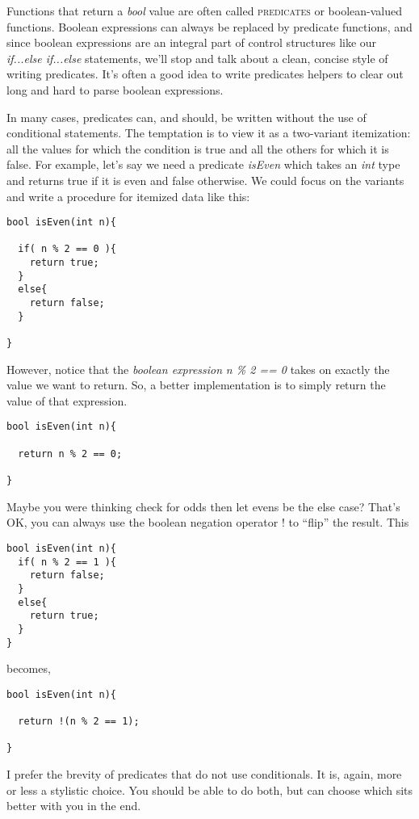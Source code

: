 \documentclass[]{tufte-handout}
\begin{document}
Functions that return a \textit{bool} value are often called \textsc{predicates} or boolean-valued functions. Boolean expressions can always be replaced by predicate functions, and since boolean expressions are an integral part of control structures like our \textit{if...else if...else} statements, we'll stop and talk about a clean, concise style of writing predicates.  It's often a good idea to write predicates helpers to clear out long and hard to parse boolean expressions. 


In many cases, predicates can, and should, be written without the use of conditional statements. The temptation is to view it as a two-variant itemization: all the values for which the condition is true and all the others for which it is false. For example, let's say we need a predicate \textit{isEven} which takes an \textit{int} type and returns true if it is even and false otherwise.  We could focus on the variants and write a procedure for itemized data like this:
\begin{verbatim}
bool isEven(int n){
  
  if( n % 2 == 0 ){
    return true;
  }
  else{
    return false;
  }
  
}
\end{verbatim}

However, notice that the \textit{boolean expression} \textit{n \% 2 == 0} takes on exactly the value we want to return. So, a better implementation is to simply return the value of that expression.
\begin{verbatim}
bool isEven(int n){
  
  return n % 2 == 0;

}
\end{verbatim}

Maybe you were thinking check for odds then let evens be the else case? That's OK, you can always use the boolean negation operator ! to ``flip'' the result. This

\begin{verbatim}
bool isEven(int n){
  if( n % 2 == 1 ){
    return false;
  }
  else{
    return true;
  }
}
\end{verbatim}
becomes,
\begin{verbatim}
bool isEven(int n){
  
  return !(n % 2 == 1);
  
}
\end{verbatim}

I prefer the brevity of predicates that do not use conditionals.  It is, again, more or less a stylistic choice. You should be able to do both, but can choose which sits better with you in the end. 
\end{document}
